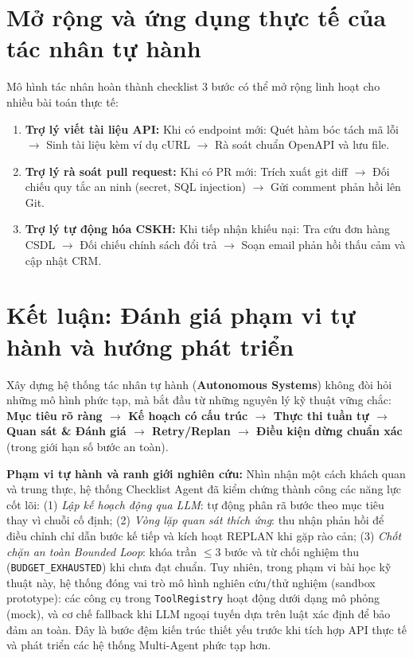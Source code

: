 \documentclass[]{article}
\providecommand{\tightlist}{%
  \setlength{\itemsep}{0pt}\setlength{\parskip}{0pt}}
\begin{document}
\section{Mở rộng và ứng dụng thực tế của tác nhân tự hành}\label{mo-rong-ung-dung}

Mô hình tác nhân hoàn thành checklist 3 bước có thể mở rộng linh hoạt cho nhiều bài toán thực tế:
\begin{enumerate}
    \tightlist
    \item \textbf{Trợ lý viết tài liệu API:} Khi có endpoint mới: Quét hàm bóc tách mã lỗi $\rightarrow$ Sinh tài liệu kèm ví dụ cURL $\rightarrow$ Rà soát chuẩn OpenAPI và lưu file.
    \item \textbf{Trợ lý rà soát pull request:} Khi có PR mới: Trích xuất git diff $\rightarrow$ Đối chiếu quy tắc an ninh (secret, SQL injection) $\rightarrow$ Gửi comment phản hồi lên Git.
    \item \textbf{Trợ lý tự động hóa CSKH:} Khi tiếp nhận khiếu nại: Tra cứu đơn hàng CSDL $\rightarrow$ Đối chiếu chính sách đổi trả $\rightarrow$ Soạn email phản hồi thấu cảm và cập nhật CRM.
\end{enumerate}

\section{Kết luận: Đánh giá phạm vi tự hành và hướng phát triển}\label{ket-luan}

Xây dựng hệ thống tác nhân tự hành (\textbf{Autonomous Systems}) không đòi hỏi những mô hình phức tạp, mà bắt đầu từ những nguyên lý kỹ thuật vững chắc: \textbf{Mục tiêu rõ ràng $\rightarrow$ Kế hoạch có cấu trúc $\rightarrow$ Thực thi tuần tự $\rightarrow$ Quan sát \& Đánh giá $\rightarrow$ Retry/Replan $\rightarrow$ Điều kiện dừng chuẩn xác} (trong giới hạn số bước an toàn).

\textbf{Phạm vi tự hành và ranh giới nghiên cứu:} Nhìn nhận một cách khách quan và trung thực, hệ thống Checklist Agent đã kiểm chứng thành công các năng lực cốt lõi: (1) \textit{Lập kế hoạch động qua LLM}: tự động phân rã bước theo mục tiêu thay vì chuỗi cố định; (2) \textit{Vòng lặp quan sát thích ứng}: thu nhận phản hồi để điều chỉnh chỉ dẫn bước kế tiếp và kích hoạt REPLAN khi gặp rào cản; (3) \textit{Chốt chặn an toàn Bounded Loop}: khóa trần $\le 3$ bước và từ chối nghiệm thu (\texttt{BUDGET\_EXHAUSTED}) khi chưa đạt chuẩn. Tuy nhiên, trong phạm vi bài học kỹ thuật này, hệ thống đóng vai trò mô hình nghiên cứu/thử nghiệm (sandbox prototype): các công cụ trong \texttt{ToolRegistry} hoạt động dưới dạng mô phỏng (mock), và cơ chế fallback khi LLM ngoại tuyến dựa trên luật xác định để bảo đảm an toàn. Đây là bước đệm kiến trúc thiết yếu trước khi tích hợp API thực tế và phát triển các hệ thống Multi-Agent phức tạp hơn.
\end{document}
